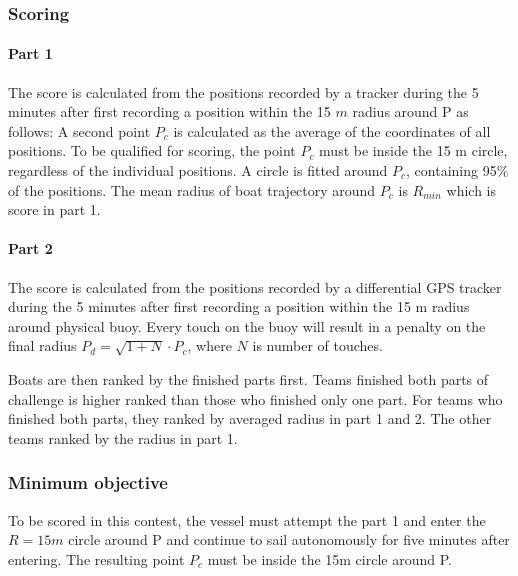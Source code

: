 \documentclass[12pt]{article}
\begin{document}
\subsubsection{Scoring}

\paragraph{Part 1}

The score is calculated from the positions recorded by a tracker during the 5
minutes after first recording a position within the 15 $m$ radius around P as
follows:
A second point $P_c$ is calculated as the average of the coordinates of all
positions. To be qualified for scoring, the point $P_c$ must be
inside the 15 m circle, regardless of the individual positions.
A circle is fitted around $P_c$, containing 95\% of the positions.
The mean radius of boat trajectory around $P_c$ is $R_{min}$ which is score in part 1.

\paragraph{Part 2}
The score is calculated from the positions recorded by a differential GPS tracker during the 5
minutes after first recording a position within the 15 m radius around physical buoy.
Every touch on the buoy will result in a penalty on the final radius $P_d = \sqrt{1+N}\cdot P_c$,
where $N$ is number of touches. 

Boats are then ranked by the finished parts first. 
Teams finished both parts of challenge is higher ranked than those who finished only one part.
For teams who finished both parts, they ranked by averaged radius in part 1 and 2.
The other teams ranked by the radius in part 1.


\subsubsection{Minimum objective}
To be scored in this contest, the vessel must attempt the part 1 and enter the $R=15m$ circle around P
and continue to sail autonomously for five minutes after entering. The resulting 
point $P_c$ must be inside the 15m circle around P.
\end{document}
